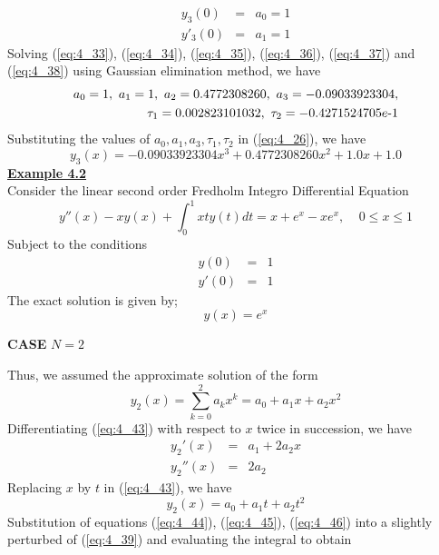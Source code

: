 \documentclass[12pt]{report}
\newcommand{\ubt}[1]{\textbf{\underline{#1}}}
\newcommand{\sps}{\\[0.2cm]}
\newcommand{\spn}[1]{\\[#1cm]}
\newcommand{\refn}[1]{(\ref{#1})}
\newcommand{\refx}[1]{\refn{eq:#1}}
\newcommand{\bt}[1]{\textbf{#1}}
\newcommand{\IDE}{Integro Differential Equation}
\newcommand{\sprime}{'}
\newcommand{\dprime}{''}
\newcommand{\NI}{\noindent}
\begin{document}
	\begin{eqnarray}
		y_3(0) &=& a_0 = 1\label{eq:4_37}\sps
		y\sprime_3(0) &=& a_1 =1 \label{eq:4_38}
	\end{eqnarray}
	Solving \refx{4_33}, \refx{4_34}, \refx{4_35}, \refx{4_36}, \refx{4_37} and \refx{4_38} using Gaussian elimination method, we have
	\begin{eqnarray}
		a_0=1,~ a_1=1, ~a_2=0.4772308260, ~a_3=-0.09033923304, \notag\\
		\tau_1=0.002823101032, ~\tau_2=-0.4271524705e\text{-1}\notag
	\end{eqnarray}
	Substituting the values of $a_0, a_1, a_3, \tau_1, \tau_2$ in \refx{4_26}, we have
	\begin{equation*}
		y_3(x) = -0.09033923304x^3 + 0.4772308260x^2 + 1.0x + 1.0
	\end{equation*}
	$\left.\right.$\spn{0.9}
	\NI\ubt{Example 4.2}\sps
	Consider the linear second order Fredholm \IDE
	\begin{equation}
		y\dprime(x) - xy(x) + \int_0^1xty(t)dt = x + e^x - xe^x, ~~~~~ 0\leq x \leq 1 \label{eq:4_39}
	\end{equation}
	Subject to the conditions
	\begin{eqnarray}
		y(0) &=& 1 \label{eq:4_40}\\
		y\sprime(0) &=& 1 \label{eq:4_41}
	\end{eqnarray}
	The exact solution is given by;
	\begin{equation}
		y(x) = e^x \label{eq:4_42}
	\end{equation}
	\begin{center}
		\large \bt{CASE} $N=2$
	\end{center}
	Thus, we assumed the approximate solution of the form
	\begin{equation}
		y_2(x) = \sum_{k=0}^{2}a_kx^k = a_0 + a_1x + a_2x^2 \label{eq:4_43}
	\end{equation}
	Differentiating \refx{4_43} with respect to $x$ twice in succession, we have 
	\begin{eqnarray}
		y_2\sprime(x) &=& a_1 + 2a_2x \label{eq:4_44}\\
		y_2\dprime(x) &=& 2a_2 \label{eq:4_45}
	\end{eqnarray}
	Replacing $x$ by $t$ in \refx{4_43}, we have
	\begin{equation}
		y_2(x) = a_0 + a_1t + a_2t^2 \label{eq:4_46}
	\end{equation}
	Substitution of equations \refx{4_44}, \refx{4_45}, \refx{4_46} into a slightly perturbed of \refx{4_39} and evaluating the integral to obtain
\end{document}

